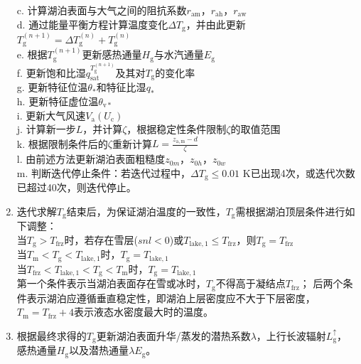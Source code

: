 \begin{enumerate}
    c. 计算湖泊表面与大气之间的阻抗系数$r_{\mathrm{am}}$，$r_{\mathrm{ah}}$，$r_{\mathrm{aw}}$ \\
    d. 通过能量平衡方程计算温度变化$\Delta T_{\mathrm {g}} $，并由此更新$T_{\mathrm {g}} ^{\left(n+1\right)}=\Delta T_{\mathrm {g}} ^{\left(n\right)}+T_{\mathrm {g}} ^{\left(n\right)}$ \\
    e. 根据$T_{\mathrm {g}} ^{\left(n+1\right)}$更新感热通量$H_{\mathrm {g}} $与水汽通量$E_{\mathrm {g}} $ \\
    f. 更新饱和比湿$q_{\mathrm{sat}}^{T_{\mathrm {g}} ^{\left(n+1\right)}}$及其对$T_{\mathrm {g}} $的变化率 \\
    g. 更新特征位温$\theta_\ast$和特征比湿$q_\ast$ \\
    h. 更新特征虚位温$\theta_{\mathrm{v\ast}}$ \\
    i. 更新大气风速$V_{\mathrm {a}} \left(U_{\mathrm {c}} \right)$ \\
    j. 计算新一步$L$，并计算$\zeta$，根据稳定性条件限制$\zeta$的取值范围 \\
    k. 根据限制条件后的$\zeta$重新计算$L=\frac{z_{\mathrm{a,m}}-d}{\zeta}$ \\
    l. 由前述方法更新湖泊表面粗糙度$z_{0m}$，$z_{0h}$，$z_{0w}$\\
    m. 判断迭代停止条件：若迭代过程中，$\Delta T_{\mathrm {g}} \leqslant 0.01$ K已出现4次，或迭代次数已超过40次，则迭代停止。
  \item 迭代求解$T_{\mathrm {g}} $结束后，为保证湖泊温度的一致性，$T_{\mathrm {g}} $需根据湖泊顶层条件进行如下调整：\\
    当$T_{\mathrm {g}} >T_{\mathrm {frz}} $时，若存在雪层($snl<0$)或$T_{\mathrm{lake,1}}\leqslant T_{\mathrm {frz}} $，则$T_{\mathrm {g}} =T_{\mathrm {frz}} $ \\
    当$T_{\mathrm {m}} <T_{\mathrm {g}} <T_{\mathrm{lake,1}}$时，$T_{\mathrm {g}} =T_{\mathrm{lake,1}}$ \\
    当$T_{\mathrm {frz}} <T_{\mathrm{lake,1}}<T_{\mathrm {g}} <T_{\mathrm {m}} $时，$T_{\mathrm {g}} =T_{\mathrm{lake,1}}$ \\
    第一个条件表示当湖泊表面存在雪或冰时，$T_{\mathrm {g}} $不得高于凝结点$T_{\mathrm {frz}} $；
    后两个条件表示湖泊应遵循垂直稳定性，即湖泊上层密度应不大于下层密度，$T_{\mathrm {m}} =T_{\mathrm {frz}} +4$表示液态水密度最大时的温度。
  \item 根据最终求得的$T_{\mathrm {g}} $更新湖泊表面升华/蒸发的潜热系数$\lambda$，上行长波辐射$L_{\mathrm {g}} ^\uparrow$，
    感热通量$H_{\mathrm {g}} $以及潜热通量$\lambda E_{\mathrm {g}} $。

\end{enumerate}
